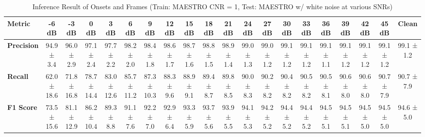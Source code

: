 \documentclass{article}
\begin{document}
\begin{table*}[htbp]
\centering
\caption{Inference Result of Onsets and Frames (Train: MAESTRO CNR = 1, Test: MAESTRO w/ white noise at various SNRs)}
\begin{adjustbox}{max width=\textwidth}
\begin{tabular}{@{}lccccccccccccccccccc@{}}
\toprule
\textbf{Metric} & \textbf{-6 dB} & \textbf{-3 dB} & \textbf{0 dB} & \textbf{3 dB} & \textbf{6 dB} & \textbf{9 dB} & \textbf{12 dB} & \textbf{15 dB} & \textbf{18 dB} & \textbf{21 dB} & \textbf{24 dB} & \textbf{27 dB} & \textbf{30 dB} & \textbf{33 dB} & \textbf{36 dB} & \textbf{39 dB} & \textbf{42 dB} & \textbf{45 dB} & \textbf{Clean} \\ 
\midrule
\textbf{Precision} & 94.9 ± 3.4 & 96.0 ± 2.9 & 97.1 ± 2.4 & 97.7 ± 2.2 & 98.2 ± 2.0 & 98.4 ± 1.8 & 98.6 ± 1.7 & 98.7 ± 1.6 & 98.8 ± 1.5 & 98.9 ± 1.4 & 99.0 ± 1.3 & 99.0 ± 1.2 & 99.1 ± 1.2 & 99.1 ± 1.2 & 99.1 ± 1.1 & 99.1 ± 1.2 & 99.1 ± 1.2 & 99.1 ± 1.2 & 99.1 ± 1.2 \\
\textbf{Recall}    & 62.0 ± 18.6 & 71.8 ± 16.8 & 78.7 ± 14.4 & 83.0 ± 12.6 & 85.7 ± 11.2 & 87.3 ± 10.3 & 88.3 ± 9.6 & 88.9 ± 9.1 & 89.4 ± 8.7 & 89.8 ± 8.5 & 90.0 ± 8.3 & 90.2 ± 8.2 & 90.4 ± 8.2 & 90.5 ± 8.2 & 90.5 ± 8.1 & 90.6 ± 8.0 & 90.6 ± 8.0 & 90.7 ± 7.9 & 90.7 ± 7.9 \\
\textbf{F1 Score}  & 73.5 ± 15.6 & 81.1 ± 12.9 & 86.2 ± 10.4 & 89.3 ± 8.8 & 91.1 ± 7.6 & 92.2 ± 7.0 & 92.9 ± 6.4 & 93.3 ± 5.9 & 93.7 ± 5.6 & 93.9 ± 5.5 & 94.1 ± 5.3 & 94.2 ± 5.2 & 94.4 ± 5.2 & 94.4 ± 5.2 & 94.5 ± 5.1 & 94.5 ± 5.1 & 94.5 ± 5.0 & 94.5 ± 5.0 & 94.6 ± 5.0 \\
\bottomrule
\end{tabular}
\end{adjustbox}
\end{table*}
\end{document}
